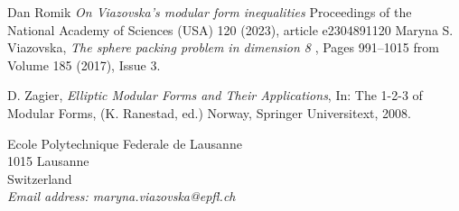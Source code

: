 \begin{thebibliography}{10}

 {\sc Dan Romik} {\em On Viazovska’s modular form inequalities} Proceedings of the National Academy of Sciences (USA) 120 (2023), article e2304891120
 {\sc Maryna S. Viazovska}, {\em The sphere packing problem in dimension 8	},
Pages 991--1015 from Volume 185 (2017), Issue 3.

 {\sc D. Zagier}, {\em Elliptic Modular Forms and Their Applications}, In:  The 1-2-3 of Modular Forms, (K. Ranestad, ed.) Norway, Springer Universitext, 2008.
\end{thebibliography}

\newpage

{\footnotesize
\noindent
Ecole Polytechnique Federale de Lausanne\\
1015 Lausanne\\
Switzerland\\
{\it Email address: maryna.viazovska@epfl.ch}}
